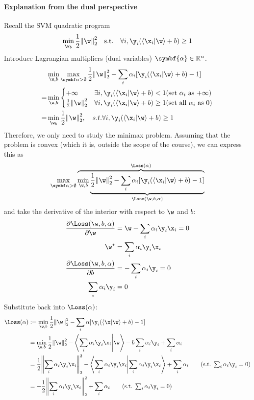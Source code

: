 \documentclass[class=cs480,notes,tikz]{agony}
\begin{document}
\paragraph{Explanation from the dual perspective}
Recall the SVM quadratic program
\[ \min_{\w_b} \frac12\norm{\w}^2_2 \qq{s.t.} \forall i,\y_i(\ip{\x_i}{\w}+b) \geq 1 \]
Introduce Lagrangian multipliers (dual variables) $\symbf{\alpha} \in \R^n$.
\begin{align*}
    & \min_{\w,b}\max_{\symbf\alpha>\0} \frac12\norm{\w}^2_2 - \sum_i \alpha_i[\y_i(\ip{\x_i}{\w}+b)-1]                                          \\
  = & \min_{\w,b} \begin{cases}
                    +\infty              & \exists i,\y_i(\ip{\x_i}{\w}+b)<1 (\text{set $\alpha_i$ as $+\infty$})   \\
                    \frac12\norm{\w}_2^2 & \forall i,\y_i(\ip{\x_i}{\w}+b)\geq 1 (\text{set all $\alpha_i$ as $0$})
                  \end{cases} \\
  = & \min_{\w_b} \frac12\norm{\w}^2_2 \qc{s.t.} \forall i,\y_i(\ip{\x_i}{\w}+b) \geq 1
\end{align*}
Therefore, we only need to study the minimax problem.
Assuming that the problem is convex (which it is, outside the scope of the course),
we can express this as
\[
  \max_{\symbf\alpha>\0} \overbrace{\min_{\w,b} \underbrace{\frac12\norm{\w}^2_2 - \sum_i \alpha_i[\y_i(\ip{\x_i}{\w}+b)-1]}_{\Loss(\w,b,\alpha)}}^{\Loss(\alpha)}
\]
and take the derivative of the interior with respect to $\w$ and $b$:
\begin{align*}
  \pdv{\Loss(\w,b,\alpha)}{\w} & = \w - \sum_i \alpha_i \y_i \x_i = 0 \\
  \w^*                         & = \sum_i \alpha_i \y_i \x_i          \\
  \pdv{\Loss(\w,b,\alpha)}{b}  & = - \sum_i \alpha_i \y_i = 0         \\
  \sum_i \alpha_i \y_i         & = 0
\end{align*}
Substitute back into $\Loss(\alpha)$:
\begin{align*}
  \Loss(\alpha)
   & := \min_{\w,b} \frac12\norm{\w}^2_2 - \sum_i \alpha[\y_i(\ip{\x}{\w}+b)-1]                                                                                    \\
   & = \min_{\w,b} \frac12\norm{\w}^2_2 - \ip{\sum_i\alpha_i\y_i\x_i}{\w} - b\sum_i \alpha_i\y_i + \sum_i \alpha_i                                                 \\
   & = \frac12\norm{\sum_i \alpha_i \y_i \x_i}^2_2 - \ip{\sum_i\alpha_i\y_i\x_i}{\sum_i \alpha_i \y_i \x_i} + \sum_i \alpha_i \tag{s.t. $\sum_i \alpha_i\y_i = 0$} \\
   & = -\frac12\norm{\sum_i \alpha_i \y_i \x_i}^2_2 + \sum_i \alpha_i                                                         \tag{s.t. $\sum_i \alpha_i\y_i = 0$}
\end{align*}
\end{document}
